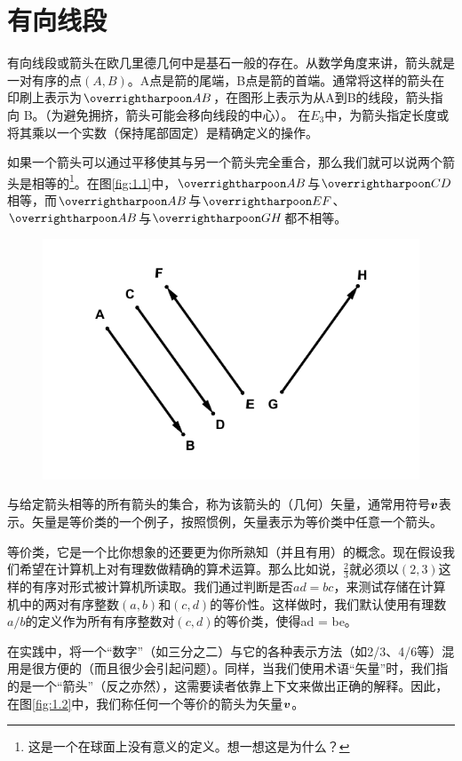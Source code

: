 \section{有向线段}

有向线段或箭头在欧几里德几何中是基石一般的存在。从数学角度来讲，箭头就是一对有序的点$(A,B)$。A点是箭的尾端，B点是箭的首端。通常将这样的箭头在印刷上表示为$\rr{AB}$，在图形上表示为从A到B的线段，箭头指向 B。（为避免拥挤，箭头可能会移向线段的中心）。 在$E_3$中，为箭头指定长度或将其乘以一个实数（保持尾部固定）是精确定义的操作。

如果一个箭头可以通过平移使其与另一个箭头完全重合，那么我们就可以说两个箭头是相等的\footnote{这是一个在球面上没有意义的定义。想一想这是为什么？}。在图\eqref{fig:1.1}中，$\rr{AB}$与$\rr{CD}$相等，而$\rr{AB}$与$\rr{EF}$、$\rr{AB}$与$\rr{GH}$都不相等。

\begin{figure}[htbp]
    \centering
    \includegraphics[scale=0.75]{./image/1.1.pdf}
    \caption{}
    \label{fig:1.1}
\end{figure}

与给定箭头相等的所有箭头的集合，称为该箭头的（几何）矢量，通常用符号$\boldsymbol{v}$表示。矢量是等价类的一个例子，按照惯例，矢量表示为等价类中任意一个箭头。

等价类，它是一个比你想象的还要更为你所熟知（并且有用）的概念。现在假设我们希望在计算机上对有理数做精确的算术运算。那么比如说，$\frac{2}{3}$就必须以$(2,3)$这样的有序对形式被计算机所读取。我们通过判断是否$ad=bc$，来测试存储在计算机中的两对有序整数$(a,b)$和$(c,d)$的等价性。这样做时，我们默认使用有理数$a/b$的定义作为所有有序整数对$(c,d)$的等价类，使得ad = be。

在实践中，将一个“数字”（如三分之二）与它的各种表示方法（如2/3、4/6等）混用是很方便的（而且很少会引起问题）。同样，当我们使用术语“矢量”时，我们指的是一个“箭头”（反之亦然），这需要读者依靠上下文来做出正确的解释。因此，在图\eqref{fig:1.2}中，我们称任何一个等价的箭头为矢量$\boldsymbol{v}$。

